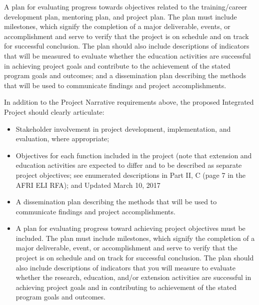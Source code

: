 \documentclass[12pt,letterpaper]{article}
\begin{document}
A plan for evaluating progress towards objectives related to the
training/career development plan, mentoring plan, and project plan. The plan
must include milestones, which signify the completion of a major deliverable,
events, or accomplishment and serve to verify that the project is on schedule
and on track for successful conclusion. The plan should also include
descriptions of indicators that will be measured to evaluate whether the
education activities are successful in achieving project goals and contribute
to the achievement of the stated program goals and outcomes; and a
dissemination plan describing the methods that will be used to communicate
findings and project accomplishments.

In addition to the Project Narrative requirements above, the proposed
Integrated Project should clearly articulate:

\begin{itemize}

  \item Stakeholder involvement in project development, implementation, and
   evaluation, where appropriate;

  \item Objectives for each function included in the project (note that extension
   and education activities are expected to differ and to be described as
   separate project objectives; see enumerated descriptions in Part II, C
   (page 7 in the AFRI ELI RFA); and Updated March 10, 2017

  \item A dissemination plan describing the methods that will be used to
   communicate findings and project accomplishments.

  \item A plan for evaluating progress toward achieving project objectives must be
   included. The plan must include milestones, which signify the completion of
   a major deliverable, event, or accomplishment and serve to verify that the
   project is on schedule and on track for successful conclusion. The plan
   should also include descriptions of indicators that you will measure to
   evaluate whether the research, education, and/or extension activities are
   successful in achieving project goals and in contributing to achievement of
   the stated program goals and outcomes.

\end{itemize}


\newpage
\AtBeginShipout{%
\AtBeginShipoutDiscard
}

\printbibliography
\end{document}
